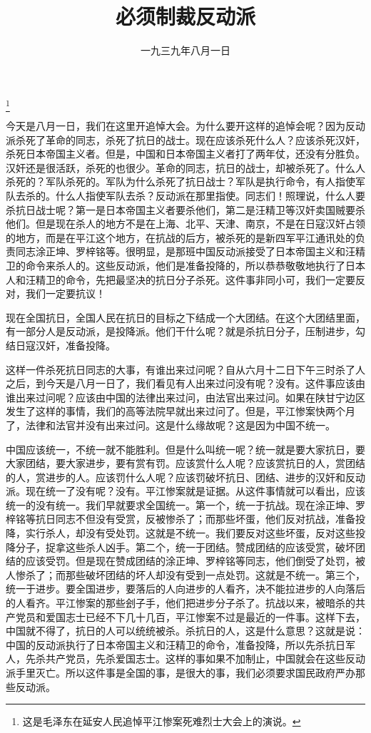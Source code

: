 
\title{必须制裁反动派}
\date{一九三九年八月一日}
\thanks{这是毛泽东在延安人民追悼平江惨案死难烈士大会上的演说。}
\maketitle


今天是八月一日，我们在这里开追悼大会。为什么要开这样的追悼会呢？因为反动派杀死了革命的同志，杀死了抗日的战士。现在应该杀死什么人？应该杀死汉奸，杀死日本帝国主义者。但是，中国和日本帝国主义者打了两年仗，还没有分胜负。汉奸还是很活跃，杀死的也很少。革命的同志，抗日的战士，却被杀死了。什么人杀死的？军队杀死的。军队为什么杀死了抗日战士？军队是执行命令，有人指使军队去杀的。什么人指使军队去杀？反动派在那里指使。同志们！照理说，什么人要杀抗日战士呢？第一是日本帝国主义者要杀他们，第二是汪精卫等汉奸卖国贼要杀他们。但是现在杀人的地方不是在上海、北平、天津、南京，不是在日寇汉奸占领的地方，而是在平江这个地方，在抗战的后方，被杀死的是新四军平江通讯处的负责同志涂正坤、罗梓铭等。很明显，是那班中国反动派接受了日本帝国主义和汪精卫的命令来杀人的。这些反动派，他们是准备投降的，所以恭恭敬敬地执行了日本人和汪精卫的命令，先把最坚决的抗日分子杀死。这件事非同小可，我们一定要反对，我们一定要抗议！

现在全国抗日，全国人民在抗日的目标之下结成一个大团结。在这个大团结里面，有一部分人是反动派，是投降派。他们干什么呢？就是杀抗日分子，压制进步，勾结日寇汉奸，准备投降。

这样一件杀死抗日同志的大事，有谁出来过问呢？自从六月十二日下午三时杀了人之后，到今天是八月一日了，我们看见有人出来过问没有呢？没有。这件事应该由谁出来过问呢？应该由中国的法律出来过问，由法官出来过问。如果在陕甘宁边区发生了这样的事情，我们的高等法院早就出来过问了。但是，平江惨案快两个月了，法律和法官并没有出来过问。这是什么缘故呢？这是因为中国不统一。

中国应该统一，不统一就不能胜利。但是什么叫统一呢？统一就是要大家抗日，要大家团结，要大家进步，要有赏有罚。应该赏什么人呢？应该赏抗日的人，赏团结的人，赏进步的人。应该罚什么人呢？应该罚破坏抗日、团结、进步的汉奸和反动派。现在统一了没有呢？没有。平江惨案就是证据。从这件事情就可以看出，应该统一的没有统一。我们早就要求全国统一。第一个，统一于抗战。现在涂正坤、罗梓铭等抗日同志不但没有受赏，反被惨杀了；而那些坏蛋，他们反对抗战，准备投降，实行杀人，却没有受处罚。这就是不统一。我们要反对这些坏蛋，反对这些投降分子，捉拿这些杀人凶手。第二个，统一于团结。赞成团结的应该受赏，破坏团结的应该受罚。但是现在赞成团结的涂正坤、罗梓铭等同志，他们倒受了处罚，被人惨杀了；而那些破坏团结的坏人却没有受到一点处罚。这就是不统一。第三个，统一于进步。要全国进步，要落后的人向进步的人看齐，决不能拉进步的人向落后的人看齐。平江惨案的那些刽子手，他们把进步分子杀了。抗战以来，被暗杀的共产党员和爱国志士已经不下几十几百，平江惨案不过是最近的一件事。这样下去，中国就不得了，抗日的人可以统统被杀。杀抗日的人，这是什么意思？这就是说：中国的反动派执行了日本帝国主义和汪精卫的命令，准备投降，所以先杀抗日军人，先杀共产党员，先杀爱国志士。这样的事如果不加制止，中国就会在这些反动派手里灭亡。所以这件事是全国的事，是很大的事，我们必须要求国民政府严办那些反动派。

